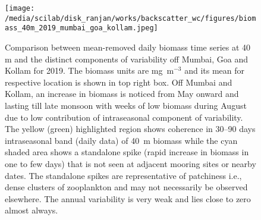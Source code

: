 \documentclass{article}
\begin{document}
\begin{figure}[htbp]
	\centering
	\texttt{[image: /media/scilab/disk\_ranjan/works/backscatter\_wc/figures/biomass\_40m\_2019\_mumbai\_goa\_kollam.jpeg]} 
	\captionsetup{justification=justified,font=footnotesize,skip=0.05\baselineskip,width=\textwidth}
	\caption{Comparison between mean-removed daily biomass time series at 40 m and the distinct components of variability off Mumbai, Goa and Kollam for 2019. The biomass units are mg~m$^{-3}$ and its mean for respective location is shown in top right box. Off Mumbai and Kollam, an increase in biomass is noticed from May onward and lasting till late monsoon with weeks of low biomass during August due to low contribution of intraseasonal component of variability. The yellow (green) highlighted region shows coherence in 30--90 days intraseasonal band (daily data) of 40~m biomass while the cyan shaded area shows a standalone spike (rapid increase in biomass in one to few days) that is not seen at adjacent mooring sites or nearby dates. The standalone spikes are representative of patchiness i.e., dense clusters of zooplankton and may not necessarily be observed elsewhere. The annual variability is very weak and lies close to zero almost always.}
	\label{fig:variability}
\end{figure}
\end{document}
